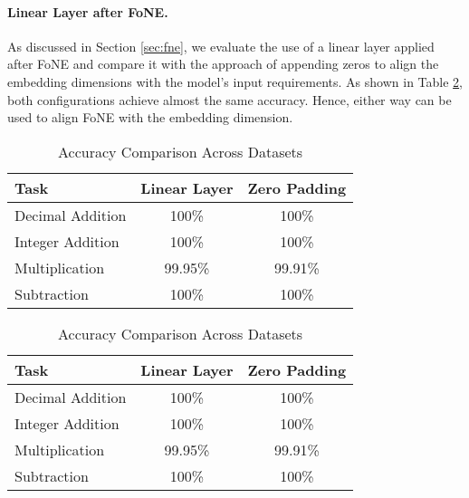 \paragraph{Linear Layer after FoNE.}
As discussed in Section \ref{sec:fne}, we evaluate the use of a linear layer applied after FoNE and compare it with the approach of appending zeros to align the embedding dimensions with the model's input requirements. As shown in Table \ref{tab:ablation_linear}, both configurations achieve almost the same accuracy. Hence, either way can be used to align FoNE with the embedding dimension.

\ifdefined\isarxiv
\begin{table}[!ht]
\centering
\setlength{\tabcolsep}{4pt} %
\caption{Accuracy Comparison Across Datasets}
\label{tab:ablation_linear}
\begin{tabular}{lcc}
\toprule
\textbf{Task} & \textbf{Linear Layer} & \textbf{Zero Padding} \\
\midrule
Decimal Addition  & 100\%  & 100\%  \\
Integer Addition  & 100\%  & 100\%  \\
Multiplication    & 99.95\% & 99.91\% \\
Subtraction       & 100\%  & 100\%  \\
\bottomrule
\end{tabular}
\end{table}

\else
\vspace{-5mm}
\begin{table}[!ht]
\centering
\small %
\setlength{\tabcolsep}{4pt} %
\caption{Accuracy Comparison Across Datasets}
\label{tab:ablation_linear}
\begin{tabular}{lcc}
\toprule
\textbf{Task} & \textbf{Linear Layer} & \textbf{Zero Padding} \\
\midrule
Decimal Addition  & 100\%  & 100\%  \\
Integer Addition  & 100\%  & 100\%  \\
Multiplication    & 99.95\% & 99.91\% \\
Subtraction       & 100\%  & 100\%  \\
\bottomrule
\end{tabular}
\vspace{-1.5mm} %
\end{table}

\fi



